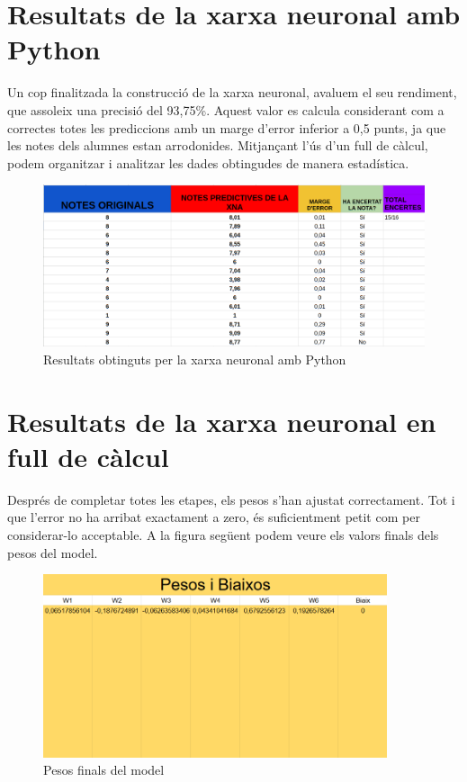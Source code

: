 \section{Resultats de la xarxa neuronal amb Python}

Un cop finalitzada la construcció de la xarxa neuronal, avaluem el seu rendiment, que assoleix una precisió del 93,75\%. Aquest valor es calcula considerant com a correctes totes les prediccions amb un marge d’error inferior a 0,5 punts, ja que les notes dels alumnes estan arrodonides. Mitjançant l’ús d’un full de càlcul, podem organitzar i analitzar les dades obtingudes de manera estadística.

\begin{figure}[h!]
 \centering
 \includegraphics[width=1\textwidth]{./figures/Resultats.png}
 \caption{Resultats obtinguts per la xarxa neuronal amb Python}
 \label{f:resultats}
\end{figure}


\section{Resultats de la xarxa neuronal en full de càlcul}\label{sec: full de càlcul}
Després de completar totes les etapes, els pesos s’han ajustat correctament. Tot i que l’error no ha arribat exactament a zero, és suficientment petit com per considerar-lo acceptable. A la figura següent podem veure els valors finals dels pesos del model.

\vspace*{1truecm}
\begin{figure}[H]
    \centering
    \includegraphics[width=0.9\textwidth]{./figures/Pesos_finals.png}
    \caption{Pesos finals del model}
\end{figure}

